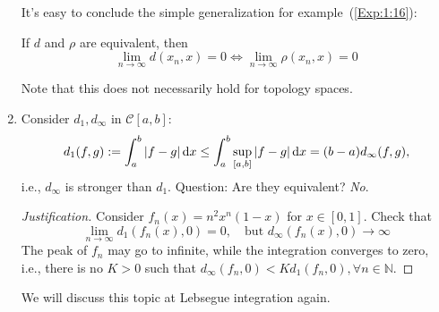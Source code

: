 \begin{example}
\begin{enumerate}
It's easy to conclude the simple generalization for example~(\ref{Exp:1:16}):
\begin{proposition}
If $d$ and $\rho$ are equivalent, then 
\[
\lim_{n\to\infty}d(x_n,x)=0\Longleftrightarrow
\lim_{n\to\infty}\rho(x_n,x)=0
\]
\end{proposition}
Note that this does not necessarily hold for topology spaces.
\item
Consider $d_1,d_\infty$ in $\mathcal{C}[a,b]$:
\[
d_1(f,g):=\int_a^b|f-g|\,\mathrm{d} x\le
\int_a^b\sup_{[a,b]}|f-g|\,\mathrm{d} x=(b-a)d_\infty(f,g),
\]
i.e., $d_\infty$ is stronger than $d_1$. Question: Are they equivalent? \emph{No}.
\begin{proof}[Justification]
Consider $f_n(x)=n^2x^n(1-x)$ for $x\in[0,1]$. Check that
\[
\lim_{n\to\infty}d_1(f_n(x),0)=0,\quad
\mbox{but }d_\infty(f_n(x),0)\to\infty
\]
The peak of $f_n$ may go to infinite, while the integration converges to zero, i.e., there is no $K>0$ such that $d_{\infty}(f_n,0) < K d_1(f_n,0),\forall n\in\mathbb{N}$.
\end{proof}
We will discuss this topic at Lebsegue integration again.
\end{enumerate}
\end{example}
